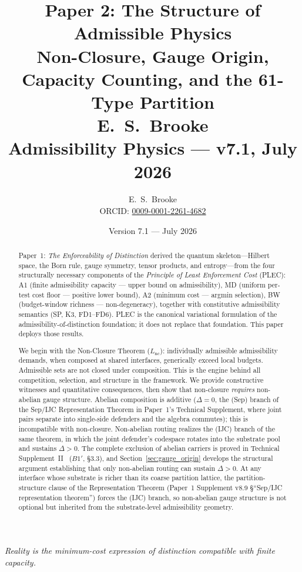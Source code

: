 \documentclass[11pt]{article}
\title{
  \textbf{Paper 2: The Structure of Admissible Physics}\\
  \large Non-Closure, Gauge Origin, Capacity Counting, and the 61-Type Partition\\
  \normalsize E.\ S.\ Brooke\\
  Admissibility Physics --- v7.1, July 2026
}
\author{E.\ S.\ Brooke \\[0.4em] \normalsize ORCID: \href{https://orcid.org/0009-0001-2261-4682}{0009-0001-2261-4682}}
\date{Version 7.1 --- July 2026}
\begin{document}
\maketitle

\bigskip

\begin{center}
\textit{Reality is the minimum-cost expression of distinction compatible with finite capacity.}
\end{center}

\bigskip

\begin{abstract}
\noindent
Paper~1: \emph{The Enforceability of Distinction} derived the quantum skeleton---Hilbert space, the Born rule, gauge symmetry, tensor products, and entropy---from the four structurally necessary components of the \emph{Principle of Least Enforcement Cost} (PLEC): A1 (finite admissibility capacity --- upper bound on admissibility), MD (uniform per-test cost floor --- positive lower bound), A2 (minimum cost --- argmin selection), BW (budget-window richness --- non-degeneracy), together with constitutive admissibility semantics (SP, K3, FD1--FD6).  PLEC is the canonical variational formulation of the admissibility-of-distinction foundation; it does not replace that foundation.  This paper deploys those results.

We begin with the Non-Closure Theorem ($L_{\mathrm{nc}}$): individually admissible admissibility demands, when composed at shared interfaces, generically exceed local budgets.  Admissible sets are not closed under composition.  This is the engine behind all competition, selection, and structure in the framework.  We provide constructive witnesses and quantitative consequences, then show that non-closure \emph{requires} non-abelian gauge structure. Abelian composition is additive ($\Delta = 0$, the (Sep) branch of the Sep/IJC Representation Theorem in Paper~1's Technical Supplement, where joint pairs separate into single-side defenders and the algebra commutes); this is incompatible with non-closure. Non-abelian routing realizes the (IJC) branch of the same theorem, in which the joint defender's codespace rotates into the substrate pool and sustains $\Delta > 0$. The complete exclusion of abelian carriers is proved in Technical Supplement~II~\cite{BrookeP2FoundSupplement} ($B1'$, \S3.3), and Section~\ref{sec:gauge_origin} develops the structural argument establishing that only non-abelian routing can sustain $\Delta > 0$.  At any interface whose substrate is richer than its coarse partition lattice, the partition-structure clause of the Representation Theorem (Paper~1 Supplement v8.9 \S``Sep/IJC representation theorem'') forces the (IJC) branch, so non-abelian gauge structure is not optional but inherited from the substrate-level admissibility geometry.


\end{abstract}
\end{document}
